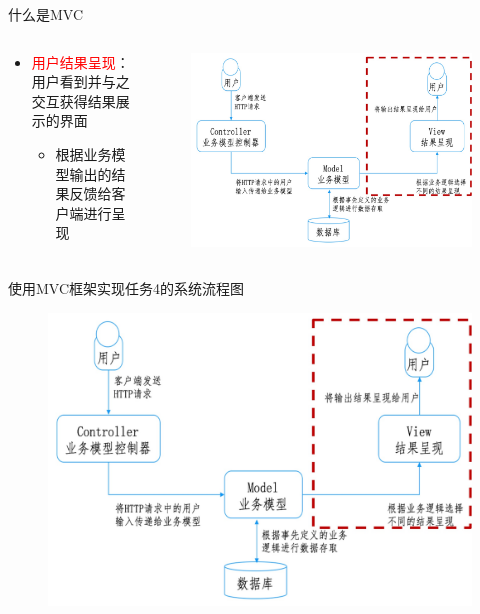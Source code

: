 \begin{frame}{什么是MVC}
\begin{columns}
\begin{column}{0.4\textwidth}
\begin{itemize}
    \item \textcolor{red}{用户结果呈现}：用户看到并与之交互获得结果展示的界面
    \begin{itemize}
        \item 根据业务模型输出的结果反馈给客户端进行呈现
    \end{itemize}
\end{itemize}
\end{column}

\begin{column}{0.6\textwidth}
\begin{figure}
    \centering
    \includegraphics[width=\textwidth]{figure/fig-18.jpg}
\end{figure}
\end{column}

\end{columns}
\end{frame}



\begin{frame}{使用MVC框架实现任务4的系统流程图}
\begin{figure}
    \centering
    \includegraphics[width=\textwidth]{figure/fig-18.jpg}
\end{figure}

\end{frame}